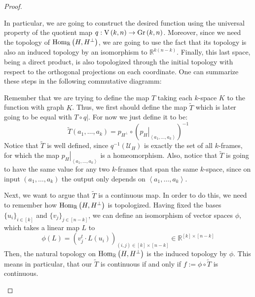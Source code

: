 \begin{proof}
\begin{b_item}
In particular, we are going to construct the desired function using the universal property of the quotient map $q:\St{k}{n}\to\Gr{k}{n}$. Moreover, since we need the topology of $\mathrm{Hom}_{\mathbb{R}}\left(H,H^{\perp}\right)$, we are going to use the fact that its topology is also an induced topology by an isomorphism to $\mathbb{R}^{k(n-k)}$. Finally, this last space, being a direct product, is also topologized through the initial topology with respect to the orthogonal projections on each coordinate. One can summarize these steps in the following commutative diagramm:
\begin{center}
\end{center}
Remember that we are trying to define the map $T$ taking each $k$-space $K$ to the function with graph $K$. Thus, we first should define the map $\tilde T$ which is later going to be equal with $T\circ\left.q\right|$. For now we just define it to be:
$$\tilde T(a_1,\ldots,a_k)=p_{H^{\perp}}\circ\left(\left.p_H\right|_{\left<a_1,\ldots,a_k\right>}\right)^{-1}$$
Notice that $\tilde T$ is well defined, since $q^{-1}\left(\mathcal{U}_H\right)$ is exactly the set of all $k$-frames, for which the map $\left.p_H\right|_{\left<a_1,\ldots,a_k\right>}$ is a homeomorphism. Also, notice that $\tilde T$ is going to have the same value for any two $k$-frames that span the same $k$-space, since on input $(a_1,\ldots,a_k)$ the output only depends on $\left<a_1,\ldots,a_k\right>$.

Next, we want to argue that $\tilde T$ is a continuous map. In order to do this, we need to remember how $\mathrm{Hom}_{\mathbb{R}}\left(H,H^{\perp}\right)$ is topologized. Having fixed the bases $\{u_i\}_{i\in[k]}$ and $\{v_j\}_{j\in[n-k]}$, we can define an isomorphism of vector spaces $\phi$, which takes a linear map $L$ to
$$\phi(L)=\left(v_j^t\cdot L(u_i)\right)_{(i,j)\in[k]\times[n-k]}\in\mathbb{R}^{[k]\times[n-k]}$$
Then, the natural topology on $\mathrm{Hom}_{\mathbb{R}}\left(H,H^{\perp}\right)$ is the induced topology by $\phi$. This means in particular, that our $\tilde T$ is continuous if and only if $f:=\phi\circ\tilde T$ is continuous.


\end{b_item}
\end{proof}
